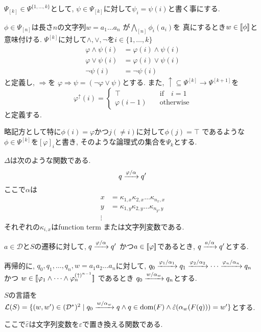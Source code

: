 \documentclass[uplatex,dvipdfmx,a4j]{jsreport}
\begin{document}
\begin{definition}
    $\Psi_{[k]} \in \Psi^{\{ 1, \ldots, k \}}$として,
    $\psi \in \Psi_{[k]}$に対して$\psi_i = \psi(i)$と書く事にする.

    $\phi \in \Psi_{[n]}$は長さ$n$の文字列$w = a_1 \ldots a_n$
    が$\bigwedge_{[n]} \phi_i(a_i)$を
    真にするとき$w \in {[ \! [{\phi}] \! ]}$と意味付ける.
    $\Psi^{[k]}$に対して$\land, \lor, \lnot$を$i \in \{ 1, \ldots, k \}$
    \begin{align*}
      \varphi \land \psi (i) &= \varphi(i) \land \psi(i) \\
      \varphi \lor \psi (i) &= \varphi(i) \lor \psi(i) \\
      \lnot \psi (i) &= \lnot \psi(i)
    \end{align*}
    と定義し, $\Rightarrow$を
    $\varphi \Rightarrow \psi = (\lnot \varphi \lor \psi)$とする.
    また, $\uparrow \subseteq \Psi^{[k]} \rightarrow \Psi^{[k + 1]}$を
    \[
      \varphi^\uparrow(i) =
        \begin{cases}
          \top \quad &\mbox{if} \quad i = 1 \\
          \varphi(i - 1) \quad &\mbox{otherwise}
        \end{cases}
    \]
    と定義する.

    略記方として特に$\phi(i) = \varphi$かつ$j (\neq i)$に対して$\phi(j) = \top$
    であるような$\phi \in \Psi^{[k]}$を$[\varphi]_i$と書き, そのような論理式の集合を$\Psi_k$とする.

    $\Delta$は次のような関数である.
    \[
      q \xrightarrow[]{\varphi / \alpha} q'
    \]
    ここで$\alpha$は
    \begin{align*}
      x &= \kappa_{1, x} \kappa_{2, x} \ldots \kappa_{n_x, x} \\
      y &= \kappa_{1, y} \kappa_{2, y} \ldots \kappa_{n_y, y} \\
      \vdots &
    \end{align*}
    それぞれの$\kappa_{i, x}$はfunction term または文字列変数である.

    $a \in \mathcal{D}$と$S$の遷移に対して, $q \xrightarrow[]{\varphi / \alpha} q'$
    かつ$a \in {[ \! [{\varphi}] \! ]}$であるとき, $q \xrightarrow[]{a / \alpha} q'$とする.

    再帰的に, $q_0, q_1, \ldots, q_n, w = a_1 a_2 \ldots a_n$に対して,
    $q_0 \xrightarrow[]{\varphi_1 / \alpha_1} q_1 \xrightarrow[]{\varphi_2 / \alpha_2}
    \cdots \xrightarrow[]{\varphi_n / \alpha_n} q_n$
    かつ
    $w \in {[ \! [{\varphi_1 \land \cdots \land \varphi_n^{(\uparrow)^{n - 1}}}] \! ]}$
    であるとき
    $q_0 \xrightarrow[]{w / \alpha_w} q_n$とする.

    $S$の言語を
    $\mathcal{L}(S) =
    \{ (w, w') \in (\mathcal{D}^*)^2 \mid
    q_0 \xrightarrow[]{w / \alpha_w} q \land
    q \in \mbox{dom}(F) \land
    \hat{\varepsilon}(\alpha_w(F(q))) = w' \}$とする.

    ここで$\hat{\varepsilon}$は文字列変数を$\varepsilon$で置き換える関数である.
  \end{definition}
\end{document}
